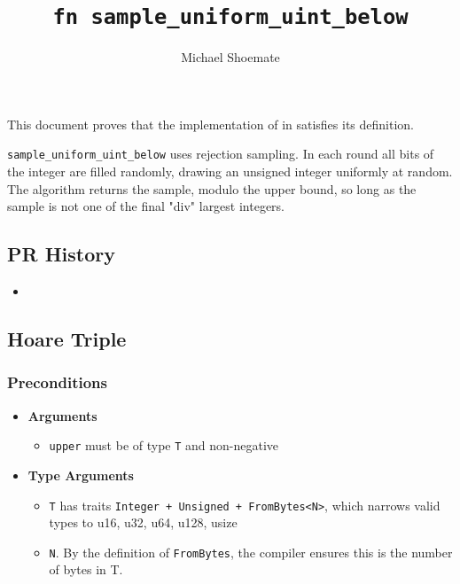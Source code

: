 \documentclass{article}
\title{\texttt{fn sample\_uniform\_uint\_below}}
\author{Michael Shoemate}
\begin{document}
\maketitle

\contrib

This document proves that the implementation of  in 
satisfies its definition.

\texttt{sample\_uniform\_uint\_below} uses rejection sampling.
In each round all bits of the integer are filled randomly, drawing an unsigned integer uniformly at random.
The algorithm returns the sample, modulo the upper bound, so long as the sample is not one of the final "div" largest integers.

\subsection*{PR History}
\begin{itemize}
    \item {}
\end{itemize}

\subsection{Hoare Triple}
\subsubsection*{Preconditions}
\begin{itemize}
    \item \textbf{Arguments}
    \begin{itemize}
        \item \texttt{upper} must be of type \texttt{T} and non-negative
    \end{itemize}

    \item \textbf{Type Arguments}
    \begin{itemize}
        \item \texttt{T} has traits \texttt{Integer + Unsigned + FromBytes<N>}, which narrows valid types to u16, u32, u64, u128, usize
        \item \texttt{N}. By the definition of \texttt{FromBytes}, the compiler ensures this is the number of bytes in T.
    \end{itemize}
\end{itemize}
\end{document}
